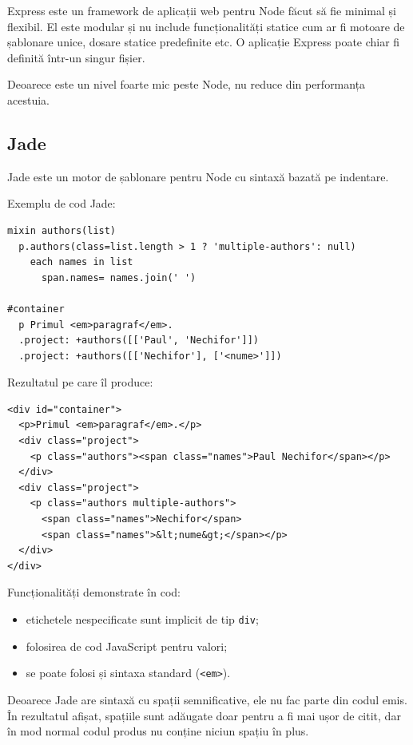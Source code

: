 \documentclass[a4wide,12pt]{report}
\newcommand{\eng}[1]{{#1}} %
\newcommand{\cod}[1]{\texttt{#1}}
\newcommand{\acr}[1]{{\textsmaller[1]{\textsc{#1}}}} %
\begin{document}
Express este un \eng{framework} de aplicații web pentru Node făcut să fie
minimal și flexibil. El este modular și nu include funcționalități statice cum
ar fi motoare de șablonare unice, dosare statice predefinite etc. O aplicație
Express poate chiar fi definită într-un singur fișier.

Deoarece este un nivel foarte mic peste Node, nu reduce din performanța
acestuia.

\subsection{Jade}

Jade este un motor de șablonare pentru Node cu sintaxă bazată pe indentare.

Exemplu de cod Jade:

\begin{verbatim}
mixin authors(list)
  p.authors(class=list.length > 1 ? 'multiple-authors': null)
    each names in list
      span.names= names.join(' ')

#container
  p Primul <em>paragraf</em>.
  .project: +authors([['Paul', 'Nechifor']])
  .project: +authors([['Nechifor'], ['<nume>']])
\end{verbatim}

Rezultatul pe care îl produce:

\begin{verbatim}
<div id="container">
  <p>Primul <em>paragraf</em>.</p>
  <div class="project">
    <p class="authors"><span class="names">Paul Nechifor</span></p>
  </div>
  <div class="project">
    <p class="authors multiple-authors">
      <span class="names">Nechifor</span>
      <span class="names">&lt;nume&gt;</span></p>
  </div>
</div>
\end{verbatim}

Funcționalități demonstrate în cod:

\begin{itemize}

\item etichetele nespecificate sunt implicit de tip \cod{div};

\item folosirea de cod JavaScript pentru valori;

\item se poate folosi și sintaxa \acr{HTML} standard (\cod{<em>}).

\end{itemize}

Deoarece Jade are sintaxă cu spații semnificative, ele nu fac parte din codul
emis. În rezultatul afișat, spațiile sunt adăugate doar pentru a fi mai ușor
de citit, dar în mod normal codul produs nu conține niciun spațiu în plus.
\end{document}
